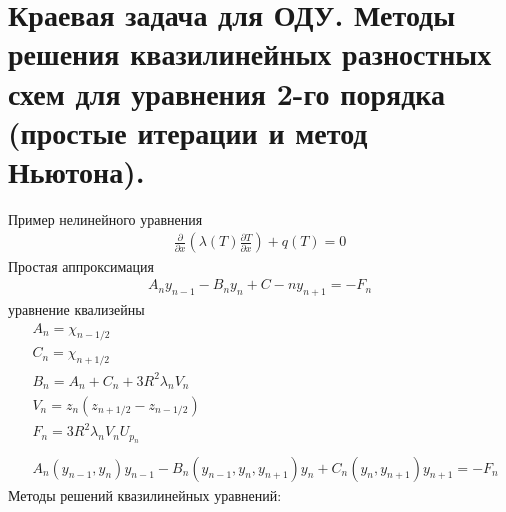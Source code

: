 \documentclass[12pt,a4paper]{article}
\begin{document}
	\section{Краевая задача для ОДУ. Методы решения квазилинейных разностных схем для уравнения 2-го порядка (простые итерации и метод Ньютона).}
	Пример нелинейного уравнения
	\begin{align*}
	\frac{\partial}{\partial x}\left( \lambda(T) \frac{\partial T}{\partial x}  \right) + q(T) = 0
	\end{align*}
	Простая аппроксимация 
	\begin{align*}
	A_n y_{n-1} - B_n y_n + C-n y_{n+1} = -F_n
	\end{align*}
	уравнение квализейны\\
	\begin{align*}
	&A_n = \chi_{n-1/2} \\
	&C_n = \chi_{n+1/2} \\
	&B_n = A_n + C_n + 3R^2 \lambda_n V_n \\
	&V_n = z_n (z_{n+1/2} - z_{n-1/2})\\
	&F_n = 3R^2 \lambda_n V_n U_{p_n}\\\\
	&A_n(y_{n-1}, y_n)y_{n-1} - B_n(y_{n-1}, y_n, y_{n+1})y_n + C_n(y_n, y_{n+1})y_{n+1} = -F_n
	\end{align*}
	Методы решений квазилинейных уравнений:
\end{document}
